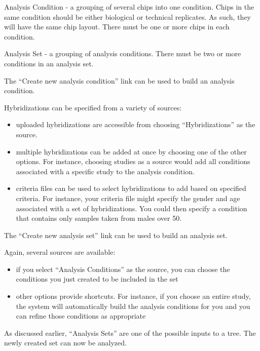 \documentclass{compactslide} %
\begin{document}
\begin{slide}

Analysis Condition - a grouping of several chips into one condition.
Chips in the same condition should be either biological or technical
replicates.  As such, they will have the same chip layout.  There must
be one or more chips in each condition.

Analysis Set - a grouping of analysis conditions.  There must be two
or more conditions in an analysis set.
\end{slide}

\begin{slide}

The ``Create new analysis condition'' link can be used to build an
analysis condition.

Hybridizations can be specified from a variety of sources:
\begin{itemize}
\item uploaded hybridizations are accessible from choosing
    ``Hybridizations'' as the source.
\item multiple hybridizations can be added at once by choosing one of the
    other options.  For instance, choosing studies as a source would add
    all conditions associated with a specific study to the analysis
    condition.
\item criteria files can be used to select hybridizations to add based on
    specified criteria.  For instance, your criteria file might specify
    the gender and age associated with a set of hybridizations.  You
    could then specify a condition that contains only samples taken from
    males over 50.
\end{itemize}
\end{slide}

\begin{slide}

The ``Create new analysis set'' link can be used to build an analysis set.

Again, several sources are available:
\begin{itemize}
\item if you select ``Analysis Conditions'' as the source, you can choose the
  conditions you just created to be included in the set
\item other options provide shortcuts.  For instance, if you choose an
  entire study, the system will automatically build the analysis
  conditions for you and you can refine those conditions as appropriate
\end{itemize}

As discussed earlier, ``Analysis Sets'' are one of the possible inputs to
a tree.  The newly created set can now be analyzed.       
\end{slide}
\end{document}
